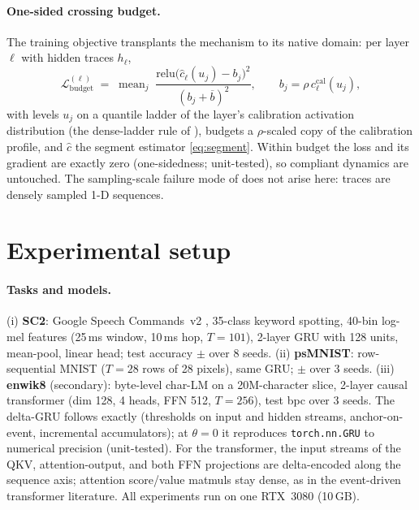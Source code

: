 \documentclass[10pt]{article}
\newcommand{\loss}{\mathcal{L}}
\begin{document}
\paragraph{One-sided crossing budget.}
The training objective transplants the \citet{howe2026budget} mechanism to
its native domain: per layer $\ell$ with hidden traces $h_\ell$,
\begin{equation}
\loss_{\mathrm{budget}}^{(\ell)} \;=\;
\operatorname{mean}_j\;
\frac{\mathrm{relu}\big(\hat c_{\ell}(u_j) - b_j\big)^2}
{(b_j + \overline{b})^2},
\qquad b_j = \rho\, c^{\mathrm{cal}}_{\ell}(u_j),
\label{eq:budget}
\end{equation}
with levels $u_j$ on a quantile ladder of the layer's calibration
activation distribution (the dense-ladder rule of
\citet{howe2026minkowski}), budgets a $\rho$-scaled copy of the calibration
profile, and $\hat c$ the segment estimator \eqref{eq:segment}. Within
budget the loss and its gradient are exactly zero (one-sidedness;
unit-tested), so compliant dynamics are untouched. The sampling-scale
failure mode of \citet{howe2026minkowski} does not arise here: traces are
densely sampled 1-D sequences.

\section{Experimental setup}
\label{sec:setup}

\paragraph{Tasks and models.}
(i) \textbf{SC2}: Google Speech Commands~v2 \citep{warden2018speech},
35-class keyword spotting, 40-bin log-mel features (25\,ms window, 10\,ms
hop, $T{=}101$), 2-layer GRU \citep{cho2014gru} with 128 units, mean-pool,
linear head; test accuracy \BaseAccSCTwo{}$\pm$\BaseAccSdSCTwo{} over 8
seeds. (ii) \textbf{psMNIST}: row-sequential MNIST \citep{lecun1998mnist}
($T{=}28$ rows of 28 pixels), same GRU;
\BaseAccPsMNIST{}$\pm$\BaseAccSdPsMNIST{} over 3 seeds. (iii)
\textbf{enwik8} (secondary): byte-level char-LM \citep{mahoney2011enwik8}
on a 20M-character slice, 2-layer causal transformer (dim 128, 4 heads, FFN
512, $T{=}256$), \BaseBpcEnwik{} test bpc over 3 seeds. The delta-GRU
follows \citet{neil2017delta} exactly (thresholds on input and hidden
streams, anchor-on-event, incremental accumulators); at $\theta{=}0$ it
reproduces \texttt{torch.nn.GRU} to numerical precision (unit-tested). For
the transformer, the input streams of the QKV, attention-output, and both
FFN projections are delta-encoded along the sequence axis; attention
score/value matmuls stay dense, as in the event-driven transformer
literature. All experiments run on one RTX~3080 (10\,GB).
\end{document}
